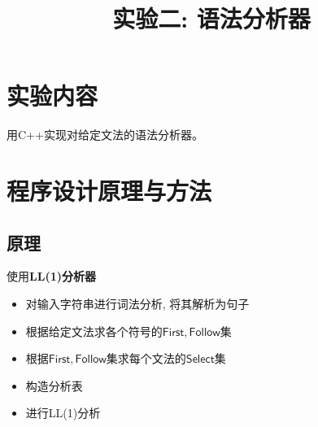 \documentclass{zpt}
\title{实验二: 语法分析器}
\begin{document}
    \maketitle
    \tableofcontents
    \clearpage
    \section{实验内容}
    用C++实现对给定文法的语法分析器。
    \section{程序设计原理与方法}
    \subsection{原理}
    使用\textbf{LL(1)分析器}
    \begin{itemize}
        \item 对输入字符串进行词法分析, 将其解析为句子
        \item 根据给定文法求各个符号的$\mathsf{First},\mathsf{Follow}$集
        \item 根据$\mathsf{First},\mathsf{Follow}$集求每个文法的$\mathsf{Select}$集
        \item 构造分析表
        \item 进行LL(1)分析
    \end{itemize}
\end{document}
